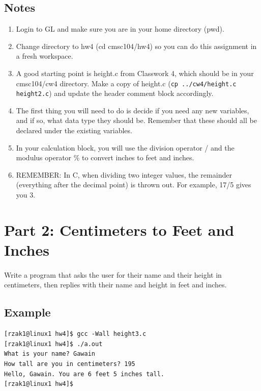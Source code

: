 \documentclass[letter,11pt]{article}
\begin{document}
\subsection*{Notes}
\begin{enumerate}
    \item Login to GL and make sure you are in your home directory (pwd).
    \item Change directory to hw4 (cd cmsc104/hw4) so you can do this assignment in a fresh workspace.
    \item A good starting point is height.c from Classwork 4, which should be in your cmsc104/cw4 directory. Make a copy of height.c  (\texttt{cp ../cw4/height.c height2.c}) and update the header comment block accordingly.
    \item The first thing you will need to do is decide if you need any new variables, and if so, what data type they should be. Remember that these should all be declared under the existing variables.
    \item In your calculation block, you will use the division operator / and the modulus operator \% to convert inches to feet and inches.
    \item REMEMBER: In C, when dividing two integer values, the remainder (everything after the decimal point) is thrown out. For example, 17/5 gives you 3.
\end{enumerate}

\section*{Part 2: Centimeters to Feet and Inches}
\paragraph{}Write a program that asks the user for their name and their height in centimeters, then replies with their name and height in feet and inches. 

\subsection*{Example}
\begin{verbatim}
[rzak1@linux1 hw4]$ gcc -Wall height3.c
[rzak1@linux1 hw4]$ ./a.out
What is your name? Gawain
How tall are you in centimeters? 195
Hello, Gawain. You are 6 feet 5 inches tall.
[rzak1@linux1 hw4]$ 
\end{verbatim}
\end{document}
